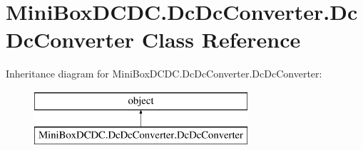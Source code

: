 \hypertarget{class_mini_box_d_c_d_c_1_1_dc_dc_converter_1_1_dc_dc_converter}{}\section{Mini\+Box\+D\+C\+D\+C.\+Dc\+Dc\+Converter.\+Dc\+Dc\+Converter Class Reference}
\label{class_mini_box_d_c_d_c_1_1_dc_dc_converter_1_1_dc_dc_converter}
Inheritance diagram for Mini\+Box\+D\+C\+D\+C.\+Dc\+Dc\+Converter.\+Dc\+Dc\+Converter\+:\begin{figure}[H]
\begin{center}
\leavevmode
\includegraphics[height=2.000000cm]{class_mini_box_d_c_d_c_1_1_dc_dc_converter_1_1_dc_dc_converter}
\end{center}
\end{figure}
